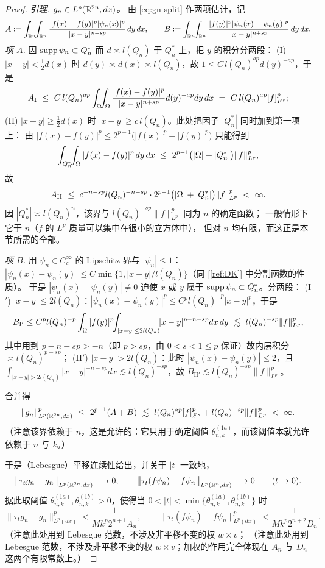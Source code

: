 \begin{proof}
\emph{引理. $g_n\in L^p(\mathbb{R}^{2n},dx)$。}
由 \eqref{eq:gn-split} 作两项估计，记
\[
  A:=\int_{\mathbb{R}^n}\!\!\int_{\mathbb{R}^n}\frac{|f(x)-f(y)|^p|\psi_n(x)|^p}{|x-y|^{n+sp}}\,dy\,dx,
  \qquad
  B:=\int_{\mathbb{R}^n}\!\!\int_{\mathbb{R}^n}\frac{|f(y)|^p|\psi_n(x)-\psi_n(y)|^p}{|x-y|^{n+sp}}\,dy\,dx .
\]
\emph{项 $A$.} 因 $\operatorname{supp}\psi_n\subset Q_n^{*}$ 而 $d\asymp l(Q_n)$ 于 $Q_n^{*}$ 上，把 $y$ 的积分分两段：
(I) $|x-y|<\tfrac12d(x)$ 时 $d(y)\asymp d(x)\asymp l(Q_n)$，故 $1\le C\,l(Q_n)^{ap}d(y)^{-ap}$，于是
\[
  A_{\mathrm{I}}\ \le\ C\,l(Q_n)^{ap}\int_\Om\!\!\int_\Om\frac{|f(x)-f(y)|^p}{|x-y|^{n+sp}}d(y)^{-ap}dy\,dx
  \ =\ C\,l(Q_n)^{ap}[f]^p_{F^s};
\]
(II) $|x-y|\ge\tfrac12d(x)$ 时 $|x-y|\ge c\,l(Q_n)$。此处把因子 $|Q_n^{*}|$ 同时加到第一项上：
由 $|f(x)-f(y)|^p\le2^{p-1}\big(|f(x)|^p+|f(y)|^p\big)$ 只能得到
\[
  \int_{Q_n^{*}}\!\!\int_\Omega|f(x)-f(y)|^p\,dy\,dx
  \ \le\ 2^{p-1}\big(|\Omega|+|Q_n^{*}|\big)\|f\|^p_{L^p} ,
\]
故
\[
  A_{\mathrm{II}}\ \le\ c^{-n-sp}l(Q_n)^{-n-sp}\cdot 2^{p-1}\big(|\Om|+|Q_n^{*}|\big)\|f\|^p_{L^p}\ <\ \infty .
\]
因 $|Q_n^{*}|\asymp l(Q_n)^n$，该界与 $l(Q_n)^{-sp}\|f\|^p_{L^p}$ 同为 $n$ 的确定函数；
一般情形下它于 $n$（$f$ 的 $L^p$ 质量可以集中在很小的立方体中），
但对 $n$ 均有限，而这正是本节所需的全部。

\emph{项 $B$.} 用 $\psi_n\in C_c^\infty$ 的 Lipschitz 界与 $|\psi_n|\le1$：
$|\psi_n(x)-\psi_n(y)|\le C\min\{1,|x-y|/l(Q_n)\}$（同 [\ref{ref:DK}] 中分割函数的性质）。
于是 $|\psi_n(x)-\psi_n(y)|\ne0$ 迫使 $x$ 或 $y$ 属于 $\operatorname{supp}\psi_n\subset Q_n^{*}$。分两段：
(I\('\)) $|x-y|\le 2l(Q_n)$：$|\psi_n(x)-\psi_n(y)|^p\le C^p l(Q_n)^{-p}|x-y|^{p}$，于是
\[
  B_{\mathrm{I}'}\le C^p l(Q_n)^{-p}\int_\Omega|f(y)|^p\!\!\int_{|x-y|\le 2l(Q_n)}\!\!|x-y|^{p-n-sp}dx\,dy
  \ \lesssim\ l(Q_n)^{-sp}\|f\|^p_{L^p},
\]
其中用到 $p-n-sp>-n$（即 $p>sp$，由 $0<s<1\le p$ 保证）故内层积分 $\asymp l(Q_n)^{p-sp}$；
(II\('\)) $|x-y|>2l(Q_n)$：此时 $|\psi_n(x)-\psi_n(y)|\le2$，且
$\int_{|x-y|>2l(Q_n)}|x-y|^{-n-sp}dx\lesssim l(Q_n)^{-sp}$，故
$B_{\mathrm{II}'}\lesssim l(Q_n)^{-sp}\|f\|^p_{L^p}$。

合并得
\[
  \|g_n\|^p_{L^p(\R^{2n},dx)}\ \le\ 2^{p-1}(A+B)
  \ \lesssim\ l(Q_n)^{ap}[f]^p_{F^s}+l(Q_n)^{-sp}\|f\|^p_{L^p}\ <\ \infty .
\]
（注意该界依赖于 $n$，这是允许的：它只用于确定阈值 $\theta^{(1a)}_{n,k}$，而该阈值本就允许依赖于 $n$ 与 $k$。）

于是（Lebesgue）平移连续性给出，并关于 $|t|$ 一致地，
\[
  \big\|\tau_tg_n-g_n\big\|_{L^p(\mathbb{R}^{2n},dx)}\longrightarrow0,
  \qquad
  \big\|\tau_t(f\psi_n)-f\psi_n\big\|_{L^p(\mathbb{R}^n,dx)}\longrightarrow0
  \qquad(t\to0).
\]
据此取阈值 $\theta^{(1a)}_{n,k},\theta^{(1b)}_{n,k}>0$，使得当
$0<|t|<\min\{\theta^{(1a)}_{n,k},\theta^{(1b)}_{n,k}\}$ 时
\[
  \big\|\tau_tg_n-g_n\big\|^p_{L^p(dx)}<\frac{1}{Mk^{p}2^{n+1}A_n},
  \qquad
  \big\|\tau_t(f\psi_n)-f\psi_n\big\|^p_{L^p(dx)}<\frac{1}{Mk^{p}2^{n+2}D_n}.
\]
（注意此处用到 Lebesgue 范数，不涉及非平移不变的权 $w\times v$；
（注意此处用到 Lebesgue 范数，不涉及非平移不变的权 $w\times v$；加权的作用完全体现在 $A_n$ 与 $D_n$ 这两个有限常数上。）


\end{proof}

